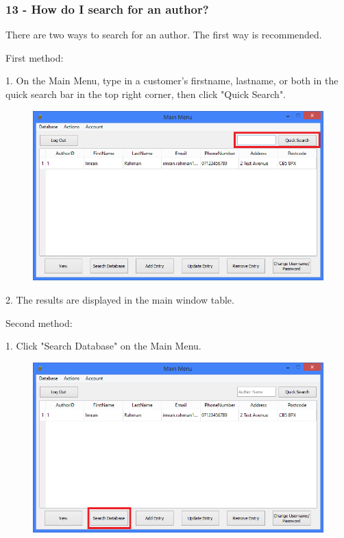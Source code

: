 \subsubsection{13 - How do I search for an author?}

There are two ways to search for an author. The first way is recommended.

First method:

1. On the Main Menu, type in a customer's firstname, lastname, or both in the quick search bar in the top right corner, then click "Quick Search".

\begin{figure}[H]
    \includegraphics[width=\textwidth]{./Manual/Tutorial/Q13/QuickSearch.png}
\end{figure}

2. The results are displayed in the main window table.

Second method:

1. Click "Search Database" on the Main Menu.

\begin{figure}[H]
    \includegraphics[width=\textwidth]{./Manual/Tutorial/Q13/SearchDatabase.png}
\end{figure}

